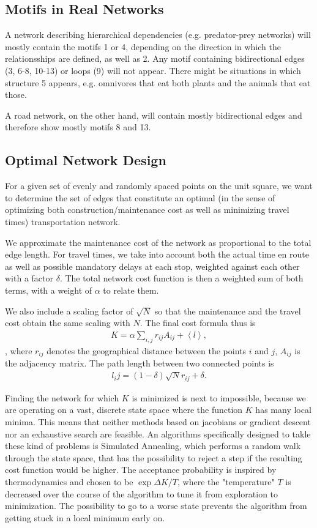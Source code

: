 \documentclass{scrartcl}
\begin{document}
\subsection{Motifs in Real Networks}
A network describing hierarchical dependencies (e.g. predator-prey networks) will mostly contain the motifs 1 or 4, depending on the direction in which the relationsships are defined, as well as 2. Any motif containing bidirectional edges (3, 6-8, 10-13) or loops (9) will not appear. There might be situations in which structure 5 appears, e.g. omnivores that eat both plants and the animals that eat those.

A road network, on the other hand, will contain mostly bidirectional edges and therefore show mostly motifs 8 and 13. 

\subsection{Optimal Network Design}
For a given set of evenly and randomly spaced points on the unit square, we
want to determine the set of edges that constitute an optimal (in the sense
of optimizing both construction/maintenance cost as well as minimizing
travel times) transportation network.

We approximate the maintenance cost of the network as proportional to the
total edge length. For travel times, we take into account both the actual
time en route as well as possible mandatory delays at each stop, weighted
against each other with a factor $\delta$. The total network cost function
is then a weighted sum of both terms, with a weight of $\alpha$ to relate
them.  

We also include a scaling factor of $\sqrt{N}$ so that the maintenance and
the travel cost obtain the same scaling with $N$. The final cost formula
thus is
\begin{align}
 K = \alpha \sum_{i,j} r_{ij} A_{ij} + \left< l \right>,
\end{align}, where $r_{ij}$ denotes the geographical distance between the points $i$ and $j$, $A_{ij}$ is the adjacency matrix.
The path length between two connected points is 
\begin{align}
 l_ij = (1-\delta) \sqrt{N} r_{ij} + \delta.
\end{align}
 
Finding the network for which $K$ is minimized is next to impossible,
because we are operating on a vast, discrete state space where the function
$K$ has many local minima. This means that neither methods based on
jacobians or gradient descent nor an exhaustive search are feasible. 
An algorithms specifically designed to takle these kind of problems is
Simulated Annealing, which performs a random walk through the state space,
that has the possibility to reject a step if the resulting cost function
would be higher. The acceptance probability is inspired by thermodynamics
and chosen to be $\exp \Delta K/T$, where the "temperature" $T$ is
decreased over the course of the algorithm to tune it from exploration to
minimization. The possibility to go to a worse state prevents the algorithm
from getting stuck in a local minimum early on.
\end{document}
